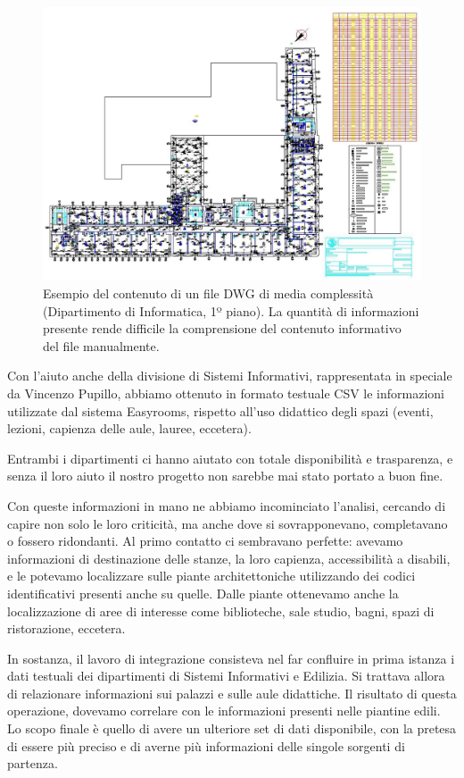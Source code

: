 \documentclass[12pt]{report}
\begin{document}
\begin{figure}[h]
    \centering
    \includegraphics[width=\textwidth]{03-dxf-chaos.jpg}
    \caption{Esempio del contenuto di un file DWG di media complessità (Dipartimento di Informatica, 1º piano). La quantità di informazioni presente rende difficile la comprensione del contenuto informativo del file manualmente. }
    \label{fig:dxf_chaos}
\end{figure}

Con l'aiuto anche della divisione di Sistemi Informativi, rappresentata in speciale da Vincenzo Pupillo, abbiamo ottenuto in formato testuale CSV le informazioni utilizzate dal sistema Easyrooms, rispetto all'uso didattico degli spazi (eventi, lezioni, capienza delle aule, lauree, eccetera).

Entrambi i dipartimenti ci hanno aiutato con totale disponibilità e trasparenza, e senza il loro aiuto il nostro progetto non sarebbe mai stato portato a buon fine.

Con queste informazioni in mano ne abbiamo incominciato l'analisi, cercando di capire non solo le loro criticità, ma anche dove si sovrapponevano, completavano o fossero ridondanti. Al primo contatto ci sembravano perfette: avevamo informazioni di destinazione delle stanze, la loro capienza, accessibilità a disabili, e le potevamo localizzare sulle piante architettoniche utilizzando dei codici identificativi presenti anche su quelle. Dalle piante ottenevamo anche la localizzazione di aree di interesse come biblioteche, sale studio, bagni, spazi di ristorazione, eccetera.

In sostanza, il lavoro di integrazione consisteva nel far confluire in prima istanza i dati testuali dei dipartimenti di Sistemi Informativi e Edilizia. Si trattava allora di relazionare informazioni sui palazzi e sulle aule didattiche. Il risultato di questa operazione, dovevamo correlare con le informazioni presenti nelle piantine edili. Lo scopo finale è quello di avere un ulteriore set di dati disponibile, con la pretesa di essere più preciso e di averne più informazioni delle singole sorgenti di partenza.
\end{document}
